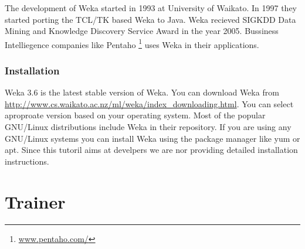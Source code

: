 \documentclass[a4paper,serif,12pt]{report}
\begin{document}
The development of Weka started in 1993 at University of Waikato. In 1997 they started porting the TCL/TK  based Weka to Java.  Weka recieved SIGKDD Data Mining and Knowledge Discovery Service Award in the year 2005. Bussiness Intelliegence  companies like Pentaho \footnote{\url{www.pentaho.com/}} uses Weka in their applications. 

\subsection{Installation}
Weka  3.6 is the latest stable version of Weka. You can download Weka from \url{http://www.cs.waikato.ac.nz/ml/weka/index_downloading.html}. You can select aproproate version based on your operating system. Most of the popular GNU/Linux  distributions include Weka in their repository. If you are using any GNU/Linux systems you can install Weka using the package manager like yum or apt. Since this tutoril aims at develpers we are nor providing detailed installation instructions. 



\chapter{Trainer}



\printindex
\end{document}
